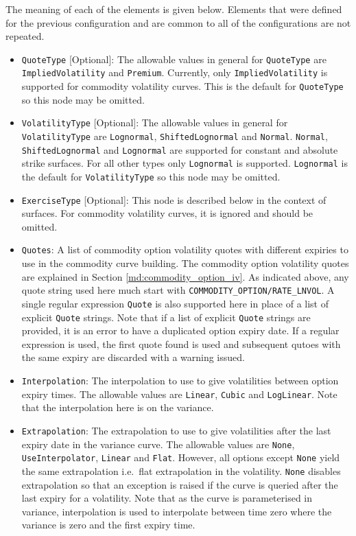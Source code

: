 The meaning of each of the elements is given below. Elements that were defined for the previous configuration and are common to all of the configurations are not repeated.
\begin{itemize}
\item \lstinline!QuoteType! [Optional]: The allowable values in general for \lstinline!QuoteType! are \lstinline!ImpliedVolatility! and \lstinline!Premium!. Currently, only \lstinline!ImpliedVolatility! is supported for commodity volatility curves. This is the default for \lstinline!QuoteType! so this node may be omitted.
\item \lstinline!VolatilityType! [Optional]: The allowable values in general for \lstinline!VolatilityType! are \lstinline!Lognormal!, \lstinline!ShiftedLognormal! and \lstinline!Normal!.
\lstinline!Normal!, \lstinline!ShiftedLognormal! and \lstinline!Lognormal! are supported for constant and absolute strike surfaces. For all other types only \lstinline!Lognormal! is supported. \lstinline!Lognormal! is the default for \lstinline!VolatilityType! so this node may be omitted.
\item \lstinline!ExerciseType! [Optional]: This node is described below in the context of surfaces. For commodity volatility curves, it is ignored and should be omitted.
\item \lstinline!Quotes!: A list of commodity option volatility quotes with different expiries to use in the commodity curve building. The commodity option volatility quotes are explained in Section \ref{md:commodity_option_iv}. As indicated above, any quote string used here much start with \lstinline!COMMODITY_OPTION/RATE_LNVOL!. A single regular expression \lstinline!Quote! is also supported here in place of a list of explicit \lstinline!Quote! strings. Note that if a list of explicit \lstinline!Quote! strings are provided, it is an error to have a duplicated option expiry date. If a regular expression is used, the first quote found is used and subsequent qutoes with the same expiry are discarded with a warning issued.
\item \lstinline!Interpolation!: The interpolation to use to give volatilities between option expiry times. The allowable values are \lstinline!Linear!, \lstinline!Cubic! and \lstinline!LogLinear!. Note that the interpolation here is on the variance.
\item \lstinline!Extrapolation!: The extrapolation to use to give volatilities after the last expiry date in the variance curve. The allowable values are \lstinline!None!, \lstinline!UseInterpolator!, \lstinline!Linear! and \lstinline!Flat!. However, all options except \lstinline!None! yield the same extrapolation i.e.\ flat extrapolation in the volatility. \lstinline!None! disables extrapolation so that an exception is raised if the curve is queried after the last expiry for a volatility. Note that as the curve is parameterised in variance, interpolation is used to interpolate between time zero where the variance is zero and the first expiry time.

\end{itemize}
